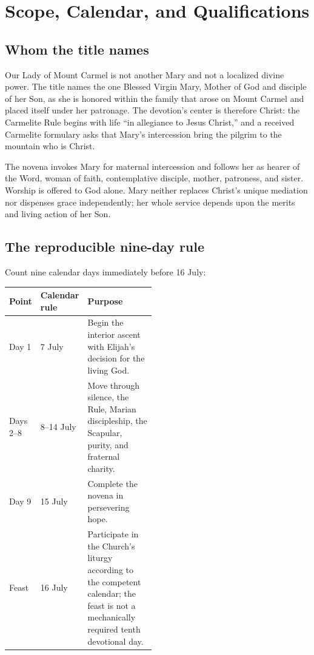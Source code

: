 \section{Scope, Calendar, and Qualifications}


\subsection{Whom the title names}

Our Lady of Mount Carmel is not another Mary and not a localized divine power. The title names the one Blessed Virgin Mary, Mother of God and disciple of her Son, as she is honored within the family that arose on Mount Carmel and placed itself under her patronage. The devotion's center is therefore Christ: the Carmelite Rule begins with life ``in allegiance to Jesus Christ,'' and a received Carmelite formulary asks that Mary's intercession bring the pilgrim to the mountain who is Christ.

The novena invokes Mary for maternal intercession and follows her as hearer of the Word, woman of faith, contemplative disciple, mother, patroness, and sister. Worship is offered to God alone. Mary neither replaces Christ's unique mediation nor dispenses grace independently; her whole service depends upon the merits and living action of her Son.

\subsection{The reproducible nine-day rule}

Count nine calendar days immediately before 16 July:

\begin{center}
\small
\begin{tabularx}{\linewidth}{@{}p{0.17\linewidth}p{0.31\linewidth}X@{}}
\toprule
\textbf{Point} & \textbf{Calendar rule} & \textbf{Purpose}\\
\midrule
Day 1 & 7 July & Begin the interior ascent with Elijah's decision for the living God.\\
Days 2--8 & 8--14 July & Move through silence, the Rule, Marian discipleship, the Scapular, purity, and fraternal charity.\\
Day 9 & 15 July & Complete the novena in persevering hope.\\
Feast & 16 July & Participate in the Church's liturgy according to the competent calendar; the feast is not a mechanically required tenth devotional day.\\
\bottomrule
\end{tabularx}
\end{center}

